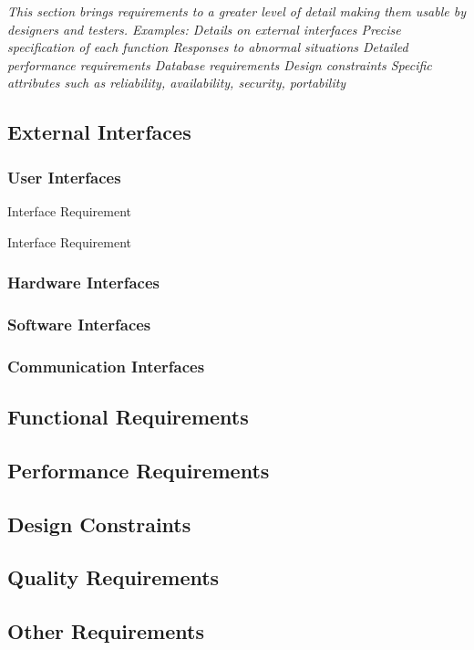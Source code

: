 \textit{This section brings requirements to a greater level of detail making them usable by designers and testers. Examples:
Details on external interfaces
Precise specification of each function
Responses to abnormal situations
Detailed performance requirements
Database requirements
Design constraints
Specific attributes such as reliability, availability, security, portability}

\subsection{External Interfaces}
\label{requirements:interfaces}

	\subsubsection{User Interfaces}
	\label{requirements:interfaces:user}

		\begin{requirement}{Interface Requirement}
		\end{requirement}

		\begin{requirement}{Interface Requirement}
		\end{requirement}

	
	\subsubsection{Hardware Interfaces}
	\label{requirements:interfaces:hardware}
	
	\subsubsection{Software Interfaces}
	\label{requirements:interfaces:software}

	\subsubsection{Communication Interfaces}
	\label{requirements:interfaces:communication}
	

\subsection{Functional Requirements}
\label{requirements:functional}


\subsection{Performance Requirements}
\label{requirements:performance}


\subsection{Design Constraints}
\label{requirements:constraints}


\subsection{Quality Requirements}
\label{requirements:quality}


\subsection{Other Requirements}
\label{requirements:other}
